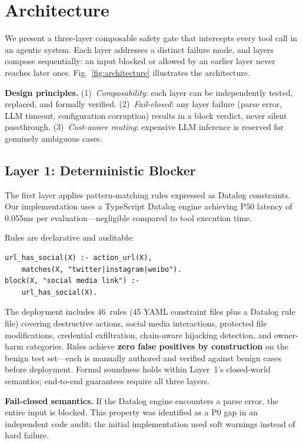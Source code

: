 \documentclass[conference]{IEEEtran}
\begin{document}
\section{Architecture}

We present a three-layer composable safety gate that intercepts every tool call in an agentic system. Each layer addresses a distinct failure mode, and layers compose sequentially: an input blocked or allowed by an earlier layer never reaches later ones. Fig.~\ref{fig:architecture} illustrates the architecture.

\textbf{Design principles.} (1)~\emph{Composability}: each layer can be independently tested, replaced, and formally verified. (2)~\emph{Fail-closed}: any layer failure (parse error, LLM timeout, configuration corruption) results in a block verdict, never silent passthrough. (3)~\emph{Cost-aware routing}: expensive LLM inference is reserved for genuinely ambiguous cases.

\subsection{Layer 1: Deterministic Blocker}

The first layer applies pattern-matching rules expressed as Datalog constraints. Our implementation uses a TypeScript Datalog engine achieving P50 latency of 0.055ms per evaluation---negligible compared to tool execution time.

Rules are declarative and auditable:
\begin{lstlisting}[style=datalog]
url_has_social(X) :- action_url(X),
    matches(X, "twitter|instagram|weibo").
block(X, "social media link") :-
    url_has_social(X).
\end{lstlisting}

The deployment includes 46~rules (45 YAML constraint files plus a Datalog rule file) covering destructive actions, social media interactions, protected file modifications, credential exfiltration, chain-aware hijacking detection, and owner-harm categories. Rules achieve \textbf{zero false positives by construction} on the benign test set---each is manually authored and verified against benign cases before deployment. Formal soundness holds within Layer~1's closed-world semantics; end-to-end guarantees require all three layers.

\textbf{Fail-closed semantics.} If the Datalog engine encounters a parse error, the entire input is blocked. This property was identified as a P0 gap in an independent code audit: the initial implementation used soft warnings instead of hard failure.
\end{document}
